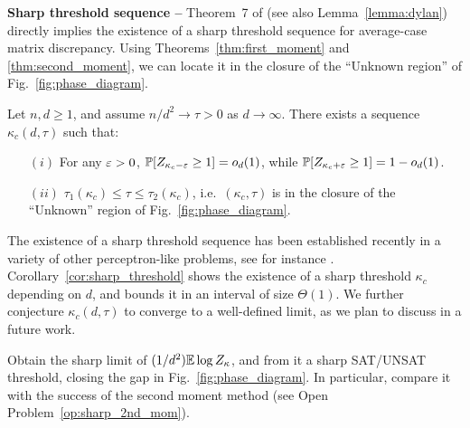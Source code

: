 \myskip 
\textbf{Sharp threshold sequence --}
Theorem~7 of \cite{altschuler2023zero} (see also Lemma~\ref{lemma:dylan})
directly implies the existence of a sharp threshold sequence for average-case matrix discrepancy. 
Using Theorems~\ref{thm:first_moment} and \ref{thm:second_moment}, we can locate it
in the closure of the ``Unknown region'' of Fig.~\ref{fig:phase_diagram}.
\begin{corollary}\label{cor:sharp_threshold}
    \noindent
    Let $n, d \geq 1$, and assume $n/d^2 \to \tau > 0$ as $d\to \infty$. There exists a sequence 
    $\kappa_c(d,\tau)$ such that: 
    \begin{itemize}
        \item[$(i)$] For any $\varepsilon > 0$, $\mathbb{P}[Z_{\kappa_c - \varepsilon} \geq 1] = o_d(1)$, while $\mathbb{P}[Z_{\kappa_c + \varepsilon} \geq 1] = 1 - o_d(1)$.
        \item[$(ii)$]  $\tau_1(\kappa_c) \leq \tau \leq \tau_2(\kappa_c)$, i.e.\ $(\kappa_c,\tau)$ is in the closure of the ``Unknown'' region of Fig.~\ref{fig:phase_diagram}.
    \end{itemize}
\end{corollary}
\noindent
The existence of a sharp threshold sequence has been established recently in a variety of other perceptron-like problems, see for instance \cite{talagrand1999self,talagrand2011mean,xu2021sharp,nakajima2023sharp,altschuler2023zero}.
Corollary~\ref{cor:sharp_threshold} shows the existence of a sharp threshold $\kappa_c$ depending on $d$, and bounds it in an interval of size $\Theta(1)$. 
We further conjecture $\kappa_c(d,\tau)$ to converge to a well-defined limit, as we plan to discuss in a future work.
\begin{openquestion}\label{op:quenched_limit}
    Obtain the sharp limit of $(1/d^2) \mathbb{E} \log Z_\kappa$, and from it a sharp SAT/UNSAT threshold, closing the gap in Fig.~\ref{fig:phase_diagram}.
    In particular, compare it with the success of the second moment method (see Open Problem~\ref{op:sharp_2nd_mom}).
\end{openquestion}

